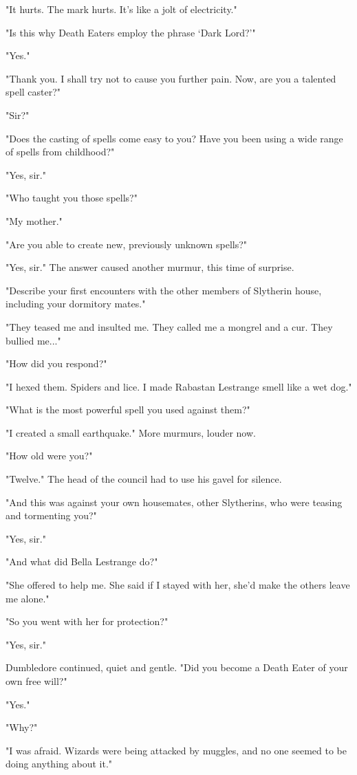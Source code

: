 \documentclass[a4paper,11pt]{article}
\begin{document}
"It hurts. The mark hurts. It's like a jolt of electricity."

"Is this why Death Eaters employ the phrase `Dark Lord?'"

"Yes."

"Thank you. I shall try not to cause you further pain. Now, are you a talented spell caster?"

"Sir?"

"Does the casting of spells come easy to you? Have you been using a wide range of spells from childhood?"

"Yes, sir."

"Who taught you those spells?"

"My mother."

"Are you able to create new, previously unknown spells?"

"Yes, sir." The answer caused another murmur, this time of surprise.

"Describe your first encounters with the other members of Slytherin house, including your dormitory mates."

"They teased me and insulted me. They called me a mongrel and a cur. They bullied me..."

"How did you respond?"

"I hexed them. Spiders and lice. I made Rabastan Lestrange smell like a wet dog."

"What is the most powerful spell you used against them?"

"I created a small earthquake." More murmurs, louder now.

"How old were you?"

"Twelve." The head of the council had to use his gavel for silence.

"And this was against your own housemates, other Slytherins, who were teasing and tormenting you?"

"Yes, sir."

"And what did Bella Lestrange do?"

"She offered to help me. She said if I stayed with her, she'd make the others leave me alone."

"So you went with her for protection?"

"Yes, sir."

Dumbledore continued, quiet and gentle. "Did you become a Death Eater of your own free will?"

"Yes."

"Why?"

"I was afraid. Wizards were being attacked by muggles, and no one seemed to be doing anything about it."
\end{document}
